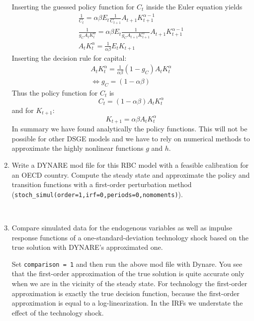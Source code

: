 \documentclass[a4paper]{scrartcl}
\begin{document}
\begin{enumerate}
\begin{solution}
	Inserting the guessed policy function for $C_t$ inside the Euler equation yields
	\begin{align*}
	\frac{1}{C_t} = \alpha \beta E_t \frac{1}{C_{t+1}}A_{t+1} K_{t+1}^{\alpha-1}\\
	\frac{1}{g_C A_t K_t^\alpha} = \alpha \beta E_t \frac{1}{g_C A_{t+1} K_{t+1}^\alpha}A_{t+1} K_{t+1}^{\alpha-1}\\
	A_t K_t^\alpha = \frac{1}{\alpha \beta} E_t K_{t+1}
	\end{align*}
	Inserting the decision rule for capital:
	\begin{align*}
		A_t K_t^\alpha = \frac{1}{\alpha \beta} (1-g_C)A_t K_t^\alpha\\
		\Leftrightarrow g_C = (1-\alpha \beta)
	\end{align*}
	Thus the policy function for $C_t$ is
	$$ C_t = (1-\alpha\beta) A_t K_t^\alpha$$
	and for $K_{t+1}$:
	$$ K_{t+1} = \alpha \beta A_t K_t^\alpha$$
	In summary we have found analytically the policy functions. This will not be possible for other DSGE models and we have to rely on numerical methods to approximate the highly nonlinear functions $g$ and $h$.
	\end{solution}
	\item Write a DYNARE mod file for this RBC model with a feasible calibration for an OECD country. Compute the steady state and approximate the policy and transition functions with a first-order perturbation method (\texttt{stoch\_simul(order=1,irf=0,periods=0,nomoments)}).
	\begin{solution}~
		
	\end{solution}
	\item Compare simulated data for the endogenous variables as well as impulse response functions of a one-standard-deviation technology shock based on the true solution with DYNARE's approximated one.
	\begin{solution}
	Set \texttt{comparison = 1} and then run the above mod file with Dynare. You see that the first-order approximation of the true solution is quite accurate only when we are in the vicinity of the steady state. For technology the first-order approximation is exactly the true decision function, because the first-order approximation is equal to a log-linearization. In the IRFs we understate the effect of the technology shock.
	\end{solution}
\end{enumerate} 
\newpage
\end{document}
